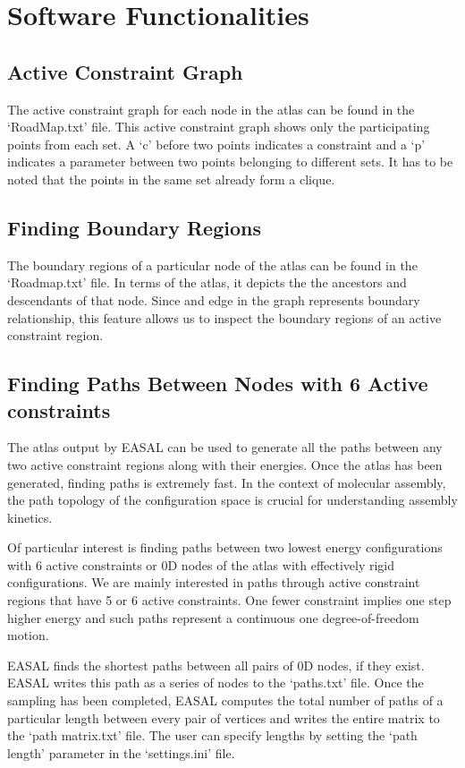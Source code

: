\documentclass[10pt]{article}
\begin{document}
\section{Software Functionalities}
\label{sec:functionalities}
\subsection{Active Constraint Graph} 
The active constraint graph for each node in the atlas can be found in the
`RoadMap.txt' file. This active constraint graph shows only the participating
points from each set. A `c' before two points indicates a constraint and a `p'
indicates a parameter between two points belonging to different sets. It has to
be noted that the points in the same set already form a clique.

\subsection{Finding Boundary Regions} The boundary regions of a particular
node of the atlas can be found in the `Roadmap.txt' file. In terms of the
atlas, it depicts the the ancestors and descendants of that node. Since and
edge in the graph represents boundary relationship, this feature allows us to
inspect the boundary regions of an active constraint region.


\subsection{Finding Paths Between Nodes with 6 Active constraints} The atlas
output by EASAL can be used to generate all the paths between any two active
constraint regions along with their energies. Once the atlas has been
generated, finding paths is extremely fast. In the context of molecular
assembly, the path topology of the configuration space is crucial for
understanding assembly kinetics.

Of particular interest is finding paths between two lowest energy
configurations with 6 active constraints or 0D nodes of the atlas with
effectively rigid configurations. We are mainly interested in paths through
active constraint regions that have 5 or 6 active constraints.
One fewer constraint implies one step higher energy and such paths 
represent a continuous one degree-of-freedom motion.

EASAL finds the shortest paths between all pairs of 0D nodes, if they exist.
EASAL writes this path as a series of nodes to the `paths.txt' file.  Once the
sampling has been completed, EASAL computes the total number of paths of a
particular length between every pair of vertices and writes the entire matrix
to the `path matrix.txt' file. The user can specify lengths by setting the
`path length' parameter in the `settings.ini' file.
\end{document}
